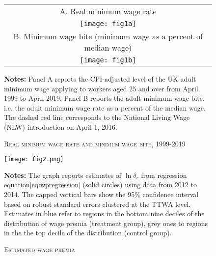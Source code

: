 \begin{figure}[pth]
\caption{\textsc{Real minimum wage rate and minimum wage bite, 1999-2019}}%
\label{fig:policy}
\begin{center}
\begin{tabular}{c}
A. Real minimum wage rate \\
\texttt{[image: fig1a]} \\
B. Minimum wage bite (minimum wage as a percent of median wage) \\
\texttt{[image: fig1b]} \\
\end{tabular}
\end{center}
\par
\footnotesize{\textbf{Notes:} Panel A reports the CPI-adjusted level of the UK adult minimum wage applying to workers aged 25 and over from April 1999 to April 2019. Panel B reports the adult minimum wage bite, i.e. the adult minimum wage rate as a percent of the median wage. The dashed red line corresponds to the National Living Wage (NLW) introduction on April 1, 2016.}
\end{figure}


\begin{figure}[pth]
\caption{\textsc{Estimated wage premia}}%
\label{fig:wagepremia}
\begin{center}
\texttt{[image: fig2.png]}
\end{center}
\par
\footnotesize{\textbf{Notes:} The graph reports estimates of $\ln \delta_r$ from regression equation\ref{eq:wpregression} (solid circles) using data from 2012 to 2014. The capped vertical bars show the 95\% confidence interval based on robust standard errors clustered at the TTWA level. Estimates in blue refer to regions in the bottom nine deciles of the distribution of wage premia (treatment group), grey ones to regions in the the top decile of the distribution (control group).}
\end{figure}


